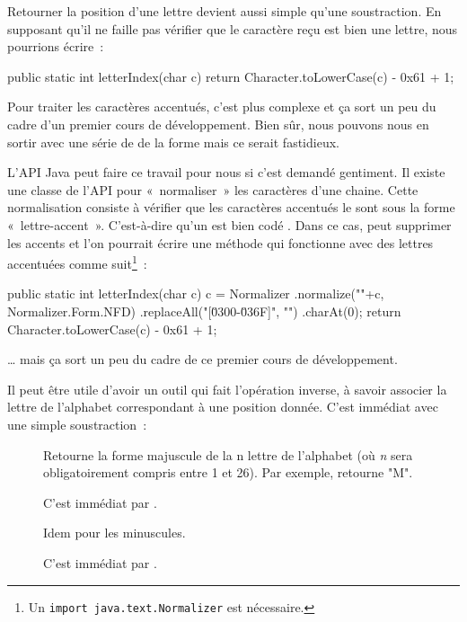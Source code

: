 	Retourner la position d'une lettre devient aussi simple qu'une
	soustraction. En supposant qu'il ne faille pas vérifier que le caractère
	reçu est bien une lettre, nous pourrions écrire~:

	\begin{java}
public static int letterIndex(char c){
	return Character.toLowerCase(c) - 0x61 + 1;
}
	\end{java}

	Pour traiter les caractères accentués, c'est plus complexe et ça sort un
	peu du cadre d'un premier cours de développement. Bien sûr, nous pouvons
	nous en sortir avec une série de  de la forme  mais ce serait fastidieux. 

	L'API Java peut faire ce travail pour nous si c'est demandé gentiment.  Il
	existe une classe de l'API pour «~normaliser~» les caractères d'une chaine.
	Cette normalisation consiste à vérifier que les caractères accentués le
	sont sous la forme «~lettre-accent~». C'est-à-dire qu'un  est bien
	codé . Dans ce cas,  peut supprimer les accents et
	l'on pourrait écrire une méthode  qui fonctionne avec des
	lettres accentuées comme suit\footnote{Un \texttt{import
	java.text.Normalizer} est nécessaire.}~:

	\begin{java}
public static int letterIndex(char c){
	c = Normalizer
		.normalize(""+c, Normalizer.Form.NFD)
		.replaceAll("[\u0300-\u036F]", "")
		.charAt(0);
	return Character.toLowerCase(c) - 0x61 + 1;
}
	\end{java}

	… mais ça sort un peu du cadre de ce premier cours de développement. 
		
	
	Il peut être utile d’avoir un outil qui fait l’opération inverse, à savoir
	associer la lettre de l’alphabet correspondant à une position donnée.
	C'est immédiat avec une simple soustraction~: 

	\begin{description}

		\item[]
		Retourne la forme majuscule de la n\ieme{} lettre de l’alphabet 
		(où \textit{n} sera obligatoirement compris entre 1 et 26). 
		Par exemple,  retourne "M".

		C'est immédiat par .

		\item[]
		Idem pour les minuscules.
		
		C'est immédiat par .

	\end{description}

